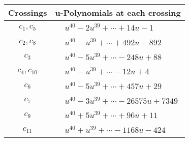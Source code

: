 \documentclass[1p]{elsarticle_modified}
\theoremstyle{definition}
\begin{document}
\begin{tabular}{m{50pt}|m{274pt}}
Crossings & \hspace{64pt}u-Polynomials at each crossing \\
\hline $$\begin{aligned}c_{1},c_{5}\end{aligned}$$&$\begin{aligned}
&u^{40}-2 u^{39}+\cdots+14 u-1
\end{aligned}$\\
\hline $$\begin{aligned}c_{2},c_{8}\end{aligned}$$&$\begin{aligned}
&u^{40}- u^{39}+\cdots+492 u-892
\end{aligned}$\\
\hline $$\begin{aligned}c_{3}\end{aligned}$$&$\begin{aligned}
&u^{40}-5 u^{39}+\cdots-248 u+88
\end{aligned}$\\
\hline $$\begin{aligned}c_{4},c_{10}\end{aligned}$$&$\begin{aligned}
&u^{40}- u^{39}+\cdots-12 u+4
\end{aligned}$\\
\hline $$\begin{aligned}c_{6}\end{aligned}$$&$\begin{aligned}
&u^{40}-5 u^{39}+\cdots+457 u+29
\end{aligned}$\\
\hline $$\begin{aligned}c_{7}\end{aligned}$$&$\begin{aligned}
&u^{40}-3 u^{39}+\cdots-26575 u+7349
\end{aligned}$\\
\hline $$\begin{aligned}c_{9}\end{aligned}$$&$\begin{aligned}
&u^{40}+5 u^{39}+\cdots+96 u+11
\end{aligned}$\\
\hline $$\begin{aligned}c_{11}\end{aligned}$$&$\begin{aligned}
&u^{40}+u^{39}+\cdots-1168 u-424
\end{aligned}$\\
\hline
\end{tabular}\\~\\
\end{document}
